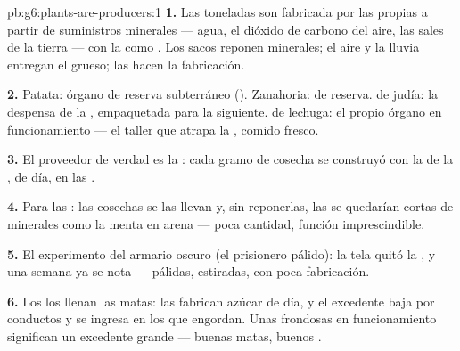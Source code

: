 \begin{solution}{pb:g6:plants-are-producers:1}
\textbf{1.} Las toneladas son  fabricada por las
propias  a partir de suministros minerales --- agua, el dióxido
de carbono del aire, las sales de la tierra --- con la  como
. Los sacos reponen minerales; el aire y la lluvia entregan el
grueso; las  hacen la fabricación.

\textbf{2.} Patata: órgano de reserva subterráneo ().
Zanahoria:  de reserva.  de judía: la despensa de la
, empaquetada para la  siguiente.  de lechuga: el
propio órgano en funcionamiento --- el taller que atrapa la , comido
fresco.

\textbf{3.} El proveedor de verdad es la : cada gramo de cosecha se
construyó con la  de la , de día, en las .

\textbf{4.} Para las : las cosechas se las llevan y, sin
reponerlas, las  se quedarían cortas de minerales como la menta
en arena --- poca cantidad, función imprescindible.

\textbf{5.} El experimento del armario oscuro (el prisionero pálido):
la tela quitó la , y una semana ya se nota --- pálidas, estiradas,
con poca fabricación.

\textbf{6.} Los  los llenan las matas: las  fabrican
azúcar de día, y el excedente baja por conductos y se ingresa en los
 que engordan. Unas  frondosas en funcionamiento
significan un excedente grande --- buenas matas, buenos .


\end{solution}
